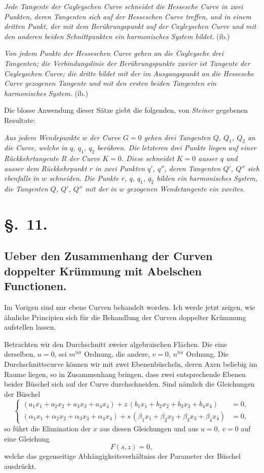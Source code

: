 \documentclass{article}
\begin{document}
\emph{Jede Tangente der Cayleyschen Curve schneidet die Hessesche Curve in zwei Punkten, deren Tangenten sich auf der Hesseschen Curve treffen, und in einem dritten Punkt, der mit dem Berührungspunkt auf der Cayleyschen Curve und mit den anderen beiden Schnittpunkten ein harmonisches System bildet.} (ib.)


\emph{Von jedem Punkte der Hesseschen Curve gehen an die Cayleysche drei Tangenten; die Verbindungslinie der Berührungspunkte zweier ist Tangente der Cayleyschen Curve; die dritte bildet mit der im Ausgangspunkt an die Hessesche Curve gezogenen Tangente und mit den ersten beiden Tangenten ein harmonisches System.} (ib.)

Die blosse Anwendung dieser Sätze giebt die folgenden, von \emph{Steiner} gegebenen Resultate:

\emph{Aus jedem Wendepunkte $w$ der Curve $G=0$ gehen drei Tangenten $Q$, $Q_{1}$, $Q_{2}$ an die Curve, welche in $q$, $q_{1}$, $q_{2}$ berühren. Die letzteren drei Punkte liegen auf einer Rückkehrtangente $R$ der Curve $K=0$. Diese schneidet $K=0$ ausser $q$ und ausser dem Rückkehrpunkt $r$ in zwei Punkten $q'$, $q''$, deren Tangenten $Q'$, $Q''$ sich ebenfalls in $w$ schneiden. Die Punkte $r$, $q$, $q_{1}$, $q_{2}$ bilden ein harmonisches System, die Tangenten $Q$, $Q'$, $Q''$ mit der in $w$ gezogenen Wendetangente ein zweites.}

\section*{§.~11.}

\subsection*{Ueber den Zusammenhang der Curven doppelter Krümmung mit Abelschen Functionen.}

Im Vorigen sind nur ebene Curven behandelt worden. Ich werde jetzt zeigen, wie ähnliche Principien sich für die Behandlung der Curven doppelter Krümmung aufstellen lassen.

Betrachten wir den Durchschnitt zweier algebraischen Flächen. Die eine derselben, $u=0$, sei $m^{\text{ter}}$ Ordnung, die andere, $v=0$, $n^{\text{ter}}$ Ordnung. Die Durchschnittscurve können wir mit zwei Ebenenbüscheln, deren Axen beliebig im Raume liegen, so in Zusammenhang bringen, dass zwei entsprechende Ebenen beider Büschel sich auf der Curve durchschneiden. Sind nämlich die Gleichungen der Büschel
\[
\left\{
\begin{aligned}
(a_{1} x_{1}+a_{2} x_{2}+a_{3} x_{3}+a_{4} x_{4})+z\,(b_{1} x_{1}+b_{2} x_{2}+b_{3} x_{3}+b_{4} x_{4}) &= 0,\\
(\alpha_{1} x_{1}+\alpha_{2} x_{2}+\alpha_{3} x_{3}+\alpha_{4} x_{4})+s\,(\beta_{1} x_{1}+\beta_{2} x_{2}+\beta_{3} x_{3}+\beta_{4} x_{4}) &= 0,
\end{aligned}
\right. \tag{17.}
\]
so führt die Elimination der $x$ aus diesen Gleichungen und aus $u=0$, $v=0$ auf eine Gleichung
\[
F(s,z) = 0, \tag{18.}
\]
welche das gegenseitige Abhängigkeitsverhältniss der Parameter der Büschel ausdrückt.
\end{document}
